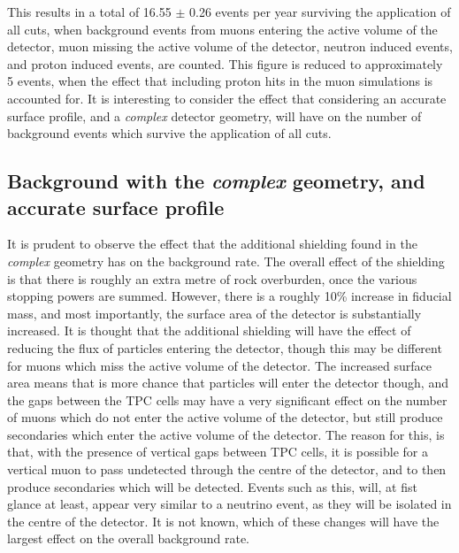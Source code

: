 This results in a total of 16.55 $\pm$ 0.26 events per year surviving the application of all cuts, when background events from muons entering the active volume of the detector, muon missing the active volume of the detector, neutron induced events, and proton induced events, are counted. This figure is reduced to approximately 5 events, when the effect that including proton hits in the muon simulations is accounted for. It is interesting to consider the effect that considering an accurate surface profile, and a \emph{complex} detector geometry, will have on the number of background events which survive the application of all cuts. \\

\subsection{Background with the \emph{complex} geometry, and accurate surface profile}
It is prudent to observe the effect that the additional shielding found in the \emph{complex} geometry has on the background rate. The overall effect of the shielding is that there is roughly an extra metre of rock overburden, once the various stopping powers are summed. However, there is a roughly 10\% increase in fiducial mass, and most importantly, the surface area of the detector is substantially increased. It is thought that the additional shielding will have the effect of reducing the flux of particles entering the detector, though this may be different for muons which miss the active volume of the detector. The increased surface area means that is more chance that particles will enter the detector though, and the gaps between the TPC cells may have a very significant effect on the number of muons which do not enter the active volume of the detector, but still produce secondaries which enter the active volume of the detector. The reason for this, is that, with the presence of vertical gaps between TPC cells, it is possible for a vertical muon to pass undetected through the centre of the detector, and to then produce secondaries which will be detected. Events such as this, will, at fist glance at least, appear very similar to a neutrino event, as they will be isolated in the centre of the detector. It is not known, which of these changes will have the largest effect on the overall background rate. \\

